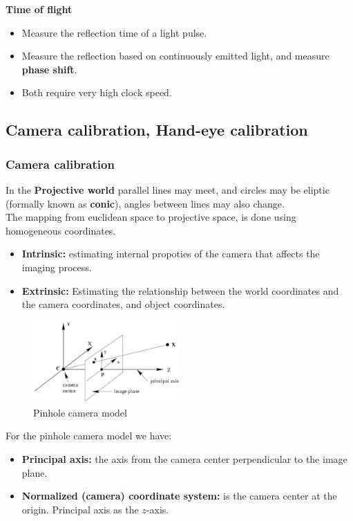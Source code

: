 \documentclass[a4paper]{article}
\begin{document}
\textbf{Time of flight} 
\begin{itemize}
	\item Measure the reflection time of a light pulse.
	\item Measure the reflection based on continuously emitted light, and measure  \textbf{phase shift}. 
	\item Both require very high clock speed.
\end{itemize}



\newpage
\subsection{Camera calibration, Hand-eye calibration}
\subsubsection{Camera calibration}
In the \textbf{Projective world} parallel lines may meet, and circles may be eliptic (formally known as \textbf{conic}), angles between lines may also change. \\

The mapping from euclidean space to projective space, is done using homogeneous coordinates. 

\begin{itemize}
	\item \textbf{Intrinsic:} estimating internal propoties of the camera that affects the imaging process.
	\item \textbf{Extrinsic:} Estimating the relationship between the world coordinates and the camera coordinates, and object coordinates. 
\end{itemize}
\begin{figure}[H]
\centering
\includegraphics[width=0.5\textwidth]{figures/pinhole_camera_model.png}
\caption{Pinhole camera model}
\label{fig:pinhole_model}
\end{figure} 

For the pinhole camera model we have:
\begin{itemize}
	\item \textbf{Principal axis: } the axis from the camera center perpendicular to the image plane.
	\item \textbf{Normalized (camera) coordinate system: } is the camera center at the origin. Principal axis as the $ z $-axis.
\end{itemize}
\end{document}
